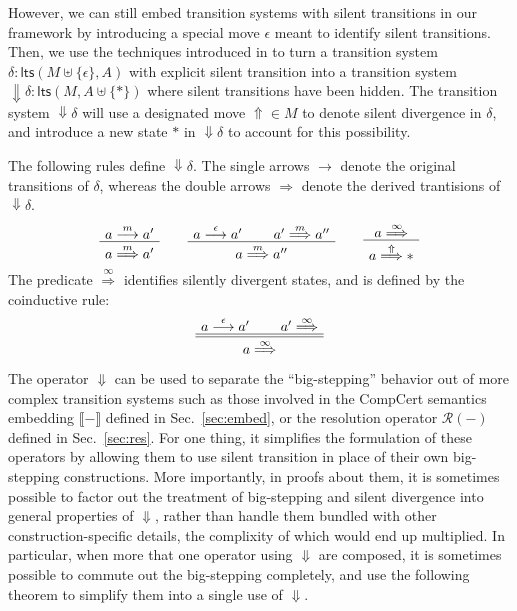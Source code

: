 \documentclass[11pt]{article}
\newcommand{\kw}[1]{{\mathsf{#1}}}
\begin{document}
However,
we can still embed transition systems with silent transitions
in our framework by introducing a special move $\epsilon$
meant to identify silent transitions.
Then, we use the techniques introduced in \cite{coindbs}
to turn a transition system
$\delta : \kw{lts}(M \uplus \{\epsilon\}, A)$
with explicit silent transition into a transition system
${\Downarrow} \delta : \kw{lts}(M, A \uplus \{ * \})$
where silent transitions have been hidden.
The transition system ${\Downarrow} \delta$
will use a designated move ${\Uparrow} \in M$
to denote silent divergence in $\delta$,
and introduce a new state $*$ in ${\Downarrow}\delta$
to account for this possibility.

The following rules define ${\Downarrow} \delta$.
The single arrows $\rightarrow$ denote
the original transitions of $\delta$,
whereas the double arrows $\Rightarrow$ denote
the derived trantisions of ${\Downarrow} \delta$.
\[
    \AxiomC{$a \stackrel{m}{\longrightarrow} a'$}
    \UnaryInfC{$a \stackrel{m}{\Longrightarrow} a'$}
    \DisplayProof
    \qquad
    \AxiomC{$a \stackrel{\epsilon}{\longrightarrow} a'$}
    \AxiomC{$a' \stackrel{m}{\Longrightarrow} a''$}
    \BinaryInfC{$a \stackrel{m}{\Longrightarrow} a''$}
    \DisplayProof
    \qquad
    \AxiomC{$a \stackrel{\infty}{\Longrightarrow}$}
    \UnaryInfC{$a \stackrel{\Uparrow}{\Longrightarrow} *$}
    \DisplayProof
\]
The predicate $\stackrel{\infty}{\Longrightarrow}$
identifies silently divergent states,
and is defined by the coinductive rule:
\[
    \AxiomC{$a \stackrel{\epsilon}{\longrightarrow} a'$}
    \AxiomC{$a' \stackrel{\infty}{\Longrightarrow}$}
    \doubleLine
    \BinaryInfC{$a \stackrel{\infty}{\Longrightarrow}$}
    \DisplayProof
\]

The operator $\Downarrow$ can be used to separate
the ``big-stepping'' behavior out of more complex transition systems
such as those involved in
the CompCert semantics embedding $\llbracket - \rrbracket$
defined in Sec.~\ref{sec:embed}, or
the resolution operator $\mathcal{R}(-)$
defined in Sec.~\ref{sec:res}.
For one thing,
it simplifies the formulation of these operators
by allowing them to use silent transition
in place of their own big-stepping constructions.
More importantly,
in proofs about them,
it is sometimes possible to factor out
the treatment of big-stepping and silent divergence
into general properties of $\Downarrow$,
rather than handle them bundled with other
construction-specific details,
the complixity of which would end up multiplied.
In particular,
when more that one operator using $\Downarrow$ are composed,
it is sometimes possible to commute out the big-stepping completely,
and use the following theorem to simplify them into
a single use of $\Downarrow$.
\end{document}
